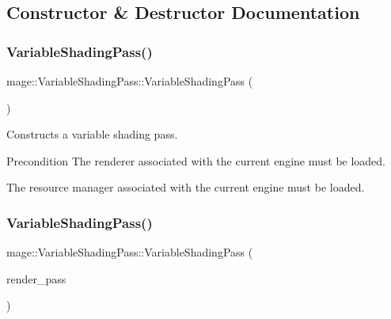 \subsection{Constructor \& Destructor Documentation}
\hypertarget{classmage_1_1_variable_shading_pass_a0c3b30167c1dcdf74daae080f2c799bc}{}\label{classmage_1_1_variable_shading_pass_a0c3b30167c1dcdf74daae080f2c799bc} 
\subsubsection{\texorpdfstring{Variable\+Shading\+Pass()}{VariableShadingPass()}\hspace{0.1cm}{\footnotesize\ttfamily [1/3]}}
{\footnotesize\ttfamily mage\+::\+Variable\+Shading\+Pass\+::\+Variable\+Shading\+Pass (\begin{DoxyParamCaption}{ }\end{DoxyParamCaption})}

Constructs a variable shading pass.

\begin{DoxyPrecond}{Precondition}
The renderer associated with the current engine must be loaded. 

The resource manager associated with the current engine must be loaded. 
\end{DoxyPrecond}
\hypertarget{classmage_1_1_variable_shading_pass_a98ce8bacba3894ff29d2a13d3a645d22}{}\label{classmage_1_1_variable_shading_pass_a98ce8bacba3894ff29d2a13d3a645d22} 
\subsubsection{\texorpdfstring{Variable\+Shading\+Pass()}{VariableShadingPass()}\hspace{0.1cm}{\footnotesize\ttfamily [2/3]}}
{\footnotesize\ttfamily mage\+::\+Variable\+Shading\+Pass\+::\+Variable\+Shading\+Pass (\begin{DoxyParamCaption}\item[{const \hyperlink{classmage_1_1_variable_shading_pass}{Variable\+Shading\+Pass} \&}]{render\+\_\+pass }\end{DoxyParamCaption})\hspace{0.3cm}{\ttfamily [delete]}}

